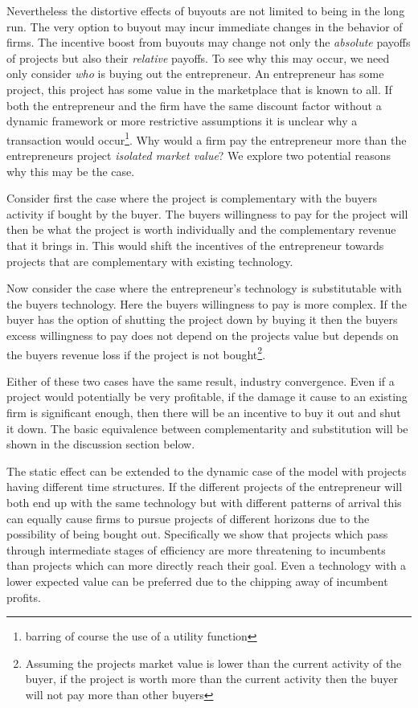 Nevertheless the distortive effects of buyouts are not limited to being in the long run. The very option to buyout may incur immediate changes in the behavior of firms. The incentive boost from buyouts may change not only the \textit{absolute} payoffs of projects but also their \textit{relative} payoffs. To see why this may occur, we need only consider \textit{who} is buying out the entrepreneur. An entrepreneur has some project, this project has some value in the marketplace that is known to all. If both the entrepreneur and the firm have the same discount factor without a dynamic framework or more restrictive assumptions it is unclear why a transaction would occur\footnote{barring of course the use of a utility function}. Why would a firm pay the entrepreneur more than the entrepreneurs project \textit{isolated market value}?  We explore two potential reasons why this may be the case.


Consider first the case where the project is complementary with the buyers activity if bought by the buyer. The buyers willingness to pay for the project will then be what the project is worth individually and the complementary revenue that it brings in. This would shift the incentives of the entrepreneur towards projects that are complementary with existing technology. 

Now consider the case where the entrepreneur's technology is substitutable with the buyers technology. Here the buyers willingness to pay is more complex. If the buyer has the option of shutting the project down by buying it then the buyers excess willingness to pay does not depend on the projects value but depends on the buyers revenue loss if the project is not bought\footnote{Assuming the projects market value is lower than the current activity of the buyer, if the project is worth more than the current activity then the buyer will not pay more than other buyers}.

Either of these two cases have the same result, industry convergence. Even if a project would potentially be very profitable, if the damage it cause to an existing firm is significant enough, then there will be an incentive to buy it out and shut it down. The basic equivalence between complementarity and substitution will be shown in the discussion section below. 

The static effect can be extended to the dynamic case of the model with projects having different time structures. If the different projects of the entrepreneur will both end up with the same technology but with different patterns of arrival this can equally cause firms to pursue projects of different horizons due to the possibility of being bought out. Specifically we show that projects which pass through intermediate stages of efficiency are more threatening to incumbents than projects which can more directly reach their goal. Even a technology with a lower expected value can be preferred due to the chipping away of incumbent profits. 

